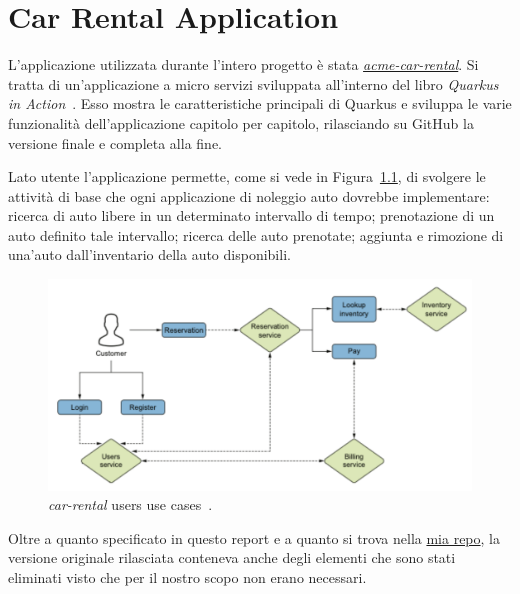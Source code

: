 \chapter{Car Rental Application}
\label{cap:app}
L'applicazione utilizzata durante l'intero progetto è stata \href{https://github.com/xstefank/quarkus-in-action}{\textit{acme-car-rental}}. Si tratta di un'applicazione a micro servizi sviluppata all'interno del libro \textit{Quarkus in Action}~\cite{quarkusinaction}. Esso mostra le caratteristiche principali di Quarkus e sviluppa le varie funzionalità dell'applicazione capitolo per capitolo, rilasciando su GitHub la versione finale e completa alla fine.

Lato utente l'applicazione permette, come si vede in Figura~\ref{fig:use_cases}, di svolgere le attività di base che ogni applicazione di noleggio auto dovrebbe implementare: ricerca di auto libere in un determinato intervallo di tempo; prenotazione di un auto definito tale intervallo; ricerca delle auto prenotate; aggiunta e rimozione di una'auto dall'inventario della auto disponibili.
\begin{figure}[htbp]
    \centering
    \includegraphics[width=\textwidth]{images/2-car-rental/use cases.pdf}
    \caption{\textit{car-rental} users use cases~\cite{quarkusinaction}.}
    \label{fig:use_cases}
\end{figure}

\myskip

Oltre a quanto specificato in questo report e a quanto si trova nella \href{https://github.com/edoardosarri24/quarkus-car-rental}{mia repo}, la versione originale rilasciata conteneva anche degli elementi che sono stati eliminati visto che per il nostro scopo non erano necessari.

